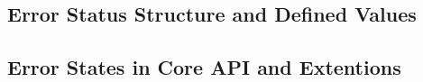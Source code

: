 \documentclass{book}
\begin{document}
\begin{appendices}
\chapter{Error Status Structure and Defined Values}
\label{errstatus} \hypertarget{errstatus}{}


\hypertarget{coreapi_dtde}{}\section{Error States in Core API and
Extentions} \label{coreapi_dtde}

\end{appendices}



\end{document}
